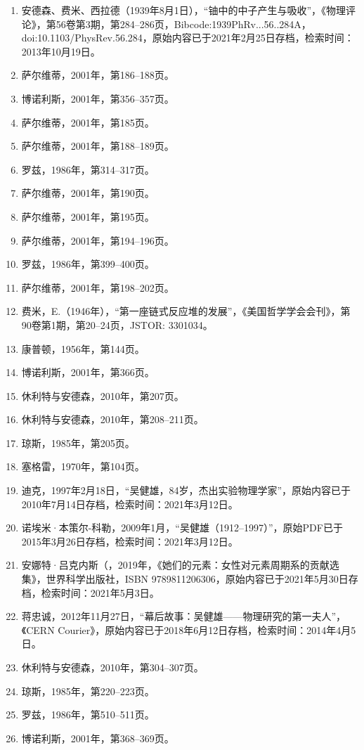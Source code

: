 \begin{enumerate}
\item 安德森、费米、西拉德（1939年8月1日），“铀中的中子产生与吸收”，《物理评论》，第56卷第3期，第284–286页，Bibcode:1939PhRv...56..284A，doi:10.1103/PhysRev.56.284，原始内容已于2021年2月25日存档，检索时间：2013年10月19日。
\item 萨尔维蒂，2001年，第186–188页。
\item 博诺利斯，2001年，第356–357页。
\item 萨尔维蒂，2001年，第185页。
\item 萨尔维蒂，2001年，第188–189页。
\item 罗兹，1986年，第314–317页。
\item 萨尔维蒂，2001年，第190页。
\item 萨尔维蒂，2001年，第195页。
\item 萨尔维蒂，2001年，第194–196页。
\item 罗兹，1986年，第399–400页。
\item 萨尔维蒂，2001年，第198–202页。
\item 费米，E.（1946年），“第一座链式反应堆的发展”，《美国哲学学会会刊》，第90卷第1期，第20–24页，JSTOR: 3301034。
\item 康普顿，1956年，第144页。
\item 博诺利斯，2001年，第366页。
\item 休利特与安德森，2010年，第207页。
\item 休利特与安德森，2010年，第208–211页。
\item 琼斯，1985年，第205页。
\item 塞格雷，1970年，第104页。
\item 迪克，1997年2月18日，“吴健雄，84岁，杰出实验物理学家”，原始内容已于2010年7月14日存档，检索时间：2021年3月12日。
\item 诺埃米·本策尔-科勒，2009年1月，“吴健雄（1912–1997）”，原始PDF已于2015年3月26日存档，检索时间：2021年3月12日。
\item 安娜特·吕克内斯（，2019年，《她们的元素：女性对元素周期系的贡献选集》，世界科学出版社，ISBN 9789811206306，原始内容已于2021年5月30日存档，检索时间：2021年5月3日。
\item 蒋忠诚，2012年11月27日，“幕后故事：吴健雄——物理研究的第一夫人”，《CERN Courier》，原始内容已于2018年6月12日存档，检索时间：2014年4月5日。
\item 休利特与安德森，2010年，第304–307页。
\item 琼斯，1985年，第220–223页。
\item 罗兹，1986年，第510–511页。
\item 博诺利斯，2001年，第368–369页。

\end{enumerate}
